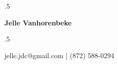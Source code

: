 \documentclass[overlapped, 10pt]{res} %
\begin{document}

\moveleft.5\hoffset\centerline{\large\bf Jelle Vanhorenbeke} %
 
\moveleft.5\hoffset\centerline{jelle.jdc@gmail.com | (872) 588-0294}



\end{document}
